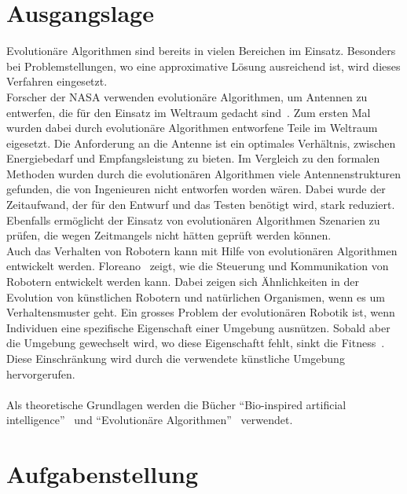   \section{Ausgangslage}

    Evolutionäre Algorithmen sind bereits in vielen Bereichen im Einsatz.
    Besonders bei Problemstellungen, wo eine approximative Lösung ausreichend ist,
    wird dieses Verfahren eingesetzt.
    \\
    Forscher der NASA verwenden evolutionäre Algorithmen, um Antennen zu entwerfen,
    die für den Einsatz im Weltraum gedacht sind~\cite{Hornby2006}.
    Zum ersten Mal wurden dabei durch evolutionäre Algorithmen entworfene Teile im Weltraum eigesetzt.
    Die Anforderung an die Antenne ist ein optimales Verhältnis, zwischen Energiebedarf und Empfangsleistung zu bieten.
    Im Vergleich zu den formalen Methoden wurden durch die evolutionären Algorithmen viele Antennenstrukturen gefunden,
    die von Ingenieuren nicht entworfen worden wären.
    Dabei wurde der Zeitaufwand, der für den Entwurf und das Testen benötigt wird, stark reduziert.
    Ebenfalls ermöglicht der Einsatz von evolutionären Algorithmen Szenarien zu prüfen,
    die wegen Zeitmangels nicht hätten geprüft werden können.
    \\
    Auch das Verhalten von Robotern kann mit Hilfe von evolutionären Algorithmen entwickelt werden.
    Floreano~\cite{Floreano2010} zeigt, wie die Steuerung und Kommunikation von Robotern entwickelt werden kann.
    Dabei zeigen sich Ähnlichkeiten in der Evolution von künstlichen Robotern und natürlichen Organismen,
    wenn es um Verhaltensmuster geht.
    Ein grosses Problem der evolutionären Robotik ist,
    wenn Individuen eine spezifische Eigenschaft einer Umgebung ausnützen.
    Sobald aber die Umgebung gewechselt wird, wo diese Eigenschaftt fehlt, sinkt die Fitness~\cite[S.6]{Floreano2010}.
    Diese Einschränkung wird durch die verwendete künstliche Umgebung hervorgerufen.
    \\
    \\
    Als theoretische Grundlagen werden die Bücher ``Bio-inspired artificial intelligence''~\cite{book:bioInspired} und
    ``Evolutionäre Algorithmen''~\cite{book:evAlgo} verwendet.

  \section{Aufgabenstellung}


